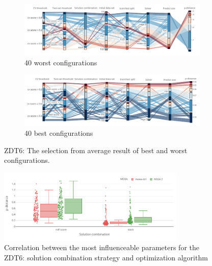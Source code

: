     \begin{figure}[!h]
        \centering
        \begin{subfigure}{\textwidth}
            \includegraphics[width=\textwidth]{content/images/conf_zdt6_worst}
            \caption{40 worst configurations}
            \label{fig:conf_zdt6_worst}
        \end{subfigure} 
        
        \begin{subfigure}{\textwidth}
            \includegraphics[width=\textwidth]{content/images/conf_zdt6_best}
            \caption{40 best configurations}
            \label{fig:conf_zdt6_best}
        \end{subfigure} 

        \caption[ZDT6: The selection from average result of best and worst configurations.]{ZDT6: The selection from average result of best and worst configurations.}
        \label{fig:conf_zdt6}    
    \end{figure}

    \begin{figure}
        \centering

        \includegraphics[width=0.8\textwidth]{content/images/conf_zdt6_solver}

        \caption[Correlation between the most influenceable parameters for the ZDT6]{Correlation between the most influenceable parameters for the ZDT6: solution combination strategy and optimization algorithm}
        \label{fig:conf_zdt6_sign}    
    \end{figure}


